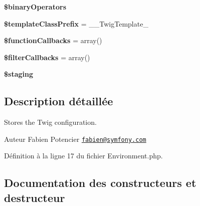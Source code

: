 \begin{DoxyCompactItemize}
\item 
{\bfseries \$binary\+Operators}\hypertarget{class_twig___environment_a0daebcbd551638ff610aee2905c70974}{}\label{class_twig___environment_a0daebcbd551638ff610aee2905c70974}

\item 
{\bfseries \$template\+Class\+Prefix} = \textquotesingle{}\+\_\+\+\_\+\+Twig\+Template\+\_\+\textquotesingle{}\hypertarget{class_twig___environment_af10faffee6faa6f0321ea6642906308d}{}\label{class_twig___environment_af10faffee6faa6f0321ea6642906308d}

\item 
{\bfseries \$function\+Callbacks} = array()\hypertarget{class_twig___environment_a3b3bccac51f11cd01d499a02b517366e}{}\label{class_twig___environment_a3b3bccac51f11cd01d499a02b517366e}

\item 
{\bfseries \$filter\+Callbacks} = array()\hypertarget{class_twig___environment_ac5fa01924d75371c25209c49df63e4ce}{}\label{class_twig___environment_ac5fa01924d75371c25209c49df63e4ce}

\item 
{\bfseries \$staging}\hypertarget{class_twig___environment_a1063dfa8a1c0b5afe9b8359237f73042}{}\label{class_twig___environment_a1063dfa8a1c0b5afe9b8359237f73042}

\end{DoxyCompactItemize}


\subsection{Description détaillée}
Stores the Twig configuration.

\begin{DoxyAuthor}{Auteur}
Fabien Potencier \href{mailto:fabien@symfony.com}{\tt fabien@symfony.\+com} 
\end{DoxyAuthor}


Définition à la ligne 17 du fichier Environment.\+php.



\subsection{Documentation des constructeurs et destructeur}
